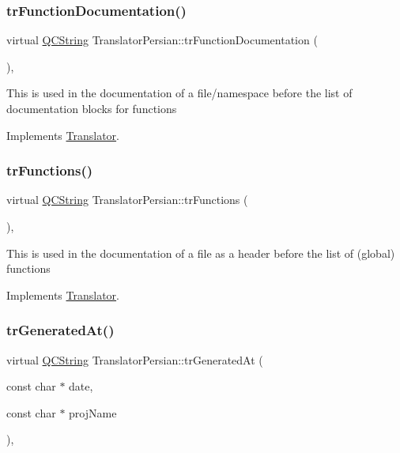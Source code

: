 \subsubsection{\texorpdfstring{trFunctionDocumentation()}{trFunctionDocumentation()}}
{\footnotesize\ttfamily virtual \mbox{\hyperlink{class_q_c_string}{Q\+C\+String}} Translator\+Persian\+::tr\+Function\+Documentation (\begin{DoxyParamCaption}{ }\end{DoxyParamCaption})\hspace{0.3cm}{\ttfamily [inline]}, {\ttfamily [virtual]}}

This is used in the documentation of a file/namespace before the list of documentation blocks for functions 

Implements \mbox{\hyperlink{class_translator}{Translator}}.

\mbox{\label{class_translator_persian_a81b63d45cee8e558c668c48a76e2f6f3}} 
\subsubsection{\texorpdfstring{trFunctions()}{trFunctions()}}
{\footnotesize\ttfamily virtual \mbox{\hyperlink{class_q_c_string}{Q\+C\+String}} Translator\+Persian\+::tr\+Functions (\begin{DoxyParamCaption}{ }\end{DoxyParamCaption})\hspace{0.3cm}{\ttfamily [inline]}, {\ttfamily [virtual]}}

This is used in the documentation of a file as a header before the list of (global) functions 

Implements \mbox{\hyperlink{class_translator}{Translator}}.

\mbox{\label{class_translator_persian_af50ee7f67e98c80007b093c47ad56e6e}} 
\subsubsection{\texorpdfstring{trGeneratedAt()}{trGeneratedAt()}}
{\footnotesize\ttfamily virtual \mbox{\hyperlink{class_q_c_string}{Q\+C\+String}} Translator\+Persian\+::tr\+Generated\+At (\begin{DoxyParamCaption}\item[{const char $\ast$}]{date,  }\item[{const char $\ast$}]{proj\+Name }\end{DoxyParamCaption})\hspace{0.3cm}{\ttfamily [inline]}, {\ttfamily [virtual]}}

